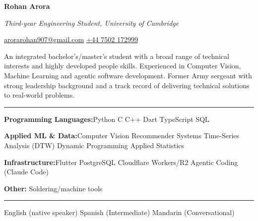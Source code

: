 \documentclass[11pt]{article}
\newcommand{\cvsection}[1]{%
  \vspace{10pt}%
  \noindent{\large\bfseries\MakeUppercase{#1}}\par
  \vspace{-4pt}\noindent\rule{\linewidth}{0.7pt}\vspace{4pt}%
}
\newcommand{\sep}{\quad\textbar\quad}
\begin{document}
\begin{center}
  {\Huge\bfseries Rohan Arora}\par
  \vspace{4pt}
  {\Large\itshape Third-year Engineering Student, University of Cambridge}\par
  \vspace{6pt}
  \href{mailto:arorarohan907@gmail.com}{arorarohan907@gmail.com}
  \sep
  \href{tel:+447502172999}{+44 7502 172999}
\end{center}

\vspace{6pt}

An integrated bachelor's/master's student with a broad range of technical interests and highly developed people skills. Experienced in Computer Vision, Machine Learning and agentic software development. Former Army sergeant with strong leadership background and a track record of delivering technical solutions to real-world problems.

\cvsection{Skills}
\textbf{Programming Languages:}\quad\quad Python \sep C \sep C++ \sep Dart \sep TypeScript \sep SQL

\textbf{Applied ML \& Data:}\quad\quad Computer Vision \sep Recommender Systems \sep Time-Series Analysis (DTW) \sep Dynamic Programming \sep Applied Statistics 

\textbf{Infrastructure:}\quad\quad Flutter \sep PostgreSQL \sep Cloudflare Workers\slash R2 \sep Agentic Coding (Claude Code) 

\textbf{Other:} Soldering\slash machine tools

\cvsection{Languages}
English (native speaker) \sep Spanish (Intermediate) \sep Mandarin (Conversational)
\end{document}
